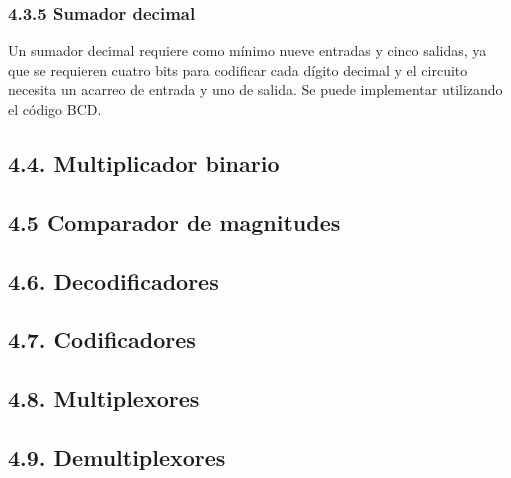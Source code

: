 \subsubsection*{4.3.5 Sumador decimal}
Un sumador decimal requiere como m\'{i}nimo nueve entradas y cinco salidas, ya que se requieren
cuatro bits para codificar cada d\'{i}gito decimal y el circuito necesita un acarreo de entrada y 
uno de salida. Se puede implementar utilizando el c\'{o}digo BCD.

\subsection*{4.4. Multiplicador binario}

\subsection*{4.5 Comparador de magnitudes}

\subsection*{4.6. Decodificadores}

\subsection*{4.7. Codificadores}

\subsection*{4.8. Multiplexores}

\subsection*{4.9. Demultiplexores}